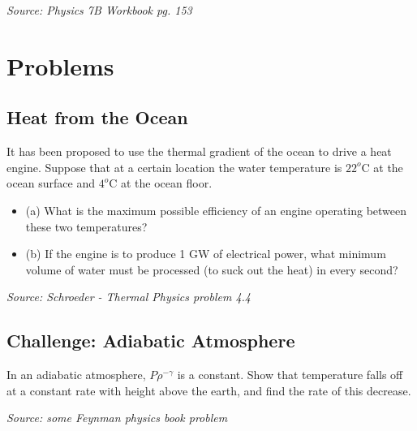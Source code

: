 \documentclass{article}
\begin{document}
\textit{Source: Physics 7B Workbook pg. 153}

\section{Problems}

\subsection{Heat from the Ocean}

It has been proposed to use the thermal gradient of the ocean to drive a heat engine. Suppose that at a certain location the water temperature is $22^o$C at the ocean surface and $4^o$C at the ocean floor.
\begin{itemize}
	\item(a) What is the maximum possible efficiency of an engine operating between these two temperatures?
	\item(b) If the engine is to produce 1 GW of electrical power, what minimum volume of water must be processed (to suck out the heat) in every second?
\end{itemize}

\textit{Source: Schroeder - Thermal Physics problem 4.4}

\subsection{Challenge: Adiabatic Atmosphere}

In an adiabatic atmosphere, $P\rho^{-\gamma}$ is a constant. Show that temperature falls off at a constant rate with height above the earth, and find the rate of this decrease.

\textit{Source: some Feynman physics book problem}
\end{document}
